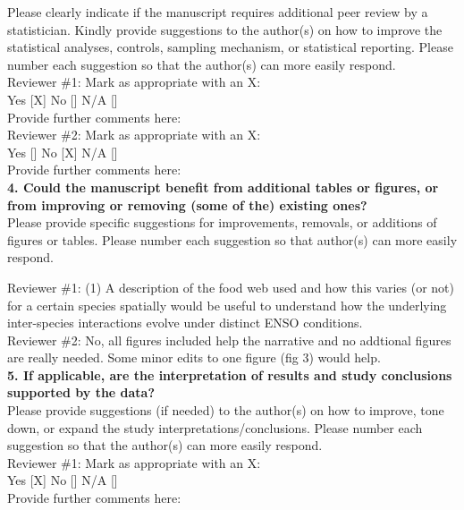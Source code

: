 \documentclass{article}
\begin{document}
Please clearly indicate if the manuscript requires additional peer review by a statistician. Kindly provide suggestions to the author(s) on how to improve the statistical analyses, controls, sampling mechanism, or statistical reporting. Please number each suggestion so that the author(s) can more easily respond.\\

Reviewer \#1: Mark as appropriate with an X:\\
Yes [X] No [] N/A []\\
Provide further comments here:\\

Reviewer \#2: Mark as appropriate with an X:\\
Yes [] No [X] N/A []\\
Provide further comments here:\\

\textbf{4. Could the manuscript benefit from additional tables or figures, or from improving or removing (some of the) existing ones?} \\

Please provide specific suggestions for improvements, removals, or additions of figures or tables. Please number each suggestion so that author(s) can more easily respond.

Reviewer \#1: (1) A description of the food web used and how this varies (or not) for a certain species spatially would be useful to understand how the underlying inter-species interactions evolve under distinct ENSO conditions.\\


Reviewer \#2: No, all figures included help the narrative and no addtional figures are really needed. Some minor edits to one figure (fig 3) would help.\\

\textbf{5. If applicable, are the interpretation of results and study conclusions supported by the data?}\\

Please provide suggestions (if needed) to the author(s) on how to improve, tone down, or expand the study interpretations/conclusions. Please number each suggestion so that the author(s) can more easily respond.\\

Reviewer \#1: Mark as appropriate with an X:\\
Yes [X] No [] N/A []\\
Provide further comments here:\\
\end{document}
